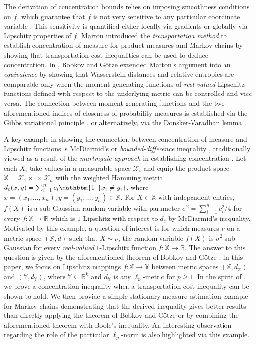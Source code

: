 \documentclass[twoside,11pt]{article}
\begin{document}
The derivation of concentration bounds relies on imposing  smoothness conditions on $f$, which guarantee that $f$ is not very sensitive to any particular coordinate variable \cite{blm13, rs13, vh16}. This sensitivity is quantified either locally via gradients or globally via Lipschitz properties of $f$. Marton introduced the  \emph{transportation method} to establish concentration of measure for product measures and Markov chains \cite{m86, m96} by showing that transportation cost inequalities can be used to deduce concentration. In \cite{bg99}, Bobkov and G\"{o}tze extended Marton's argument into an \emph{equivalence} by showing that Wasserstein distances and relative entropies are comparable only when the moment-generating functions of \emph{real-valued} Lipschitz functions defined with respect to the underlying metric can be controlled and vice versa. The connection between moment-generating functions and the two aforementioned indices of closeness of probability measures is established via the Gibbs variational principle \cite{vh16},\cite{zd98} or alternatively, via the Donsker-Varadhan lemma \cite{r15}. 

A key example in showing the connection between concentration of measure and Lipschitz functions is McDiarmid's or \emph{bounded-difference} inequality \cite{mc97}, traditionally viewed as a result of the  \emph{martingale approach} in establishing concentration \cite{blm13, rs13, vh16}. Let each $X_i$ take values in a measurable space $\mathcal{X}_i$ and equip the product space $\mathbb{X}=\mathcal{X}_1\times \cdot \times \mathcal{X}_n$ with the weighted Hamming metric $d_c(x,y)=\sum_{i=1}^n c_i \mathbbm{1}\{x_i\neq y_i\}$, where $x=(x_1,\ldots, x_n), y=(y_1,\ldots, y_n) \in \mathbb{X}$. For $X \in \mathbb{X}$ with independent entries, $f(X)$ is a sub-Gaussian random variable with parameter $\sigma^2=\sum_{i=1}^n c_i^2/4$ for every $f:\mathbb{X}\rightarrow \mathbb{R}$ which is $1$-Lipschitz with respect to $d_c$ by McDiarmid's inequality. Motivated by this example, a question of interest is for which measures $\nu$ on a metric space $(\mathbb{X},d)$ such that $X\sim \nu$, the random variable $f(X)$ is $\sigma^2$-sub-Gaussian for every \emph{real-valued} $1$-Lipschitz function $f:\mathbb{X}\rightarrow \mathbb{R}$. The answer to this question is given by the aforementioned theorem of Bobkov and G\"{o}tze \cite{bg99}. In this paper, we focus on Lipschitz mappings $f:\mathbb{X}\rightarrow \mathbb{Y}$ between metric spaces $(\mathbb{X},d_{\mathbb{X}})$ and $(\mathbb{Y},d_{\mathbb{Y}})$, where $\mathbb{Y}\subseteq \mathbb{R}^k$ and $d_{\mathbb{Y}}$ is any $\ell_p$-metric for $p\geq 1$. In the spirit of \cite{m86,m96,bg99}, we prove a concentration inequality when a transportation cost inequality can be shown to hold. We then provide a simple stationary measure estimation example for  Markov chains demonstrating that the derived inequality gives better results than directly applying the theorem of Bobkov and G\"{o}tze or by combining the aforementioned theorem with Boole's inequality. An interesting observation regarding the role of the particular $\ell_p$-norm is also highlighted via this example.
\end{document}
